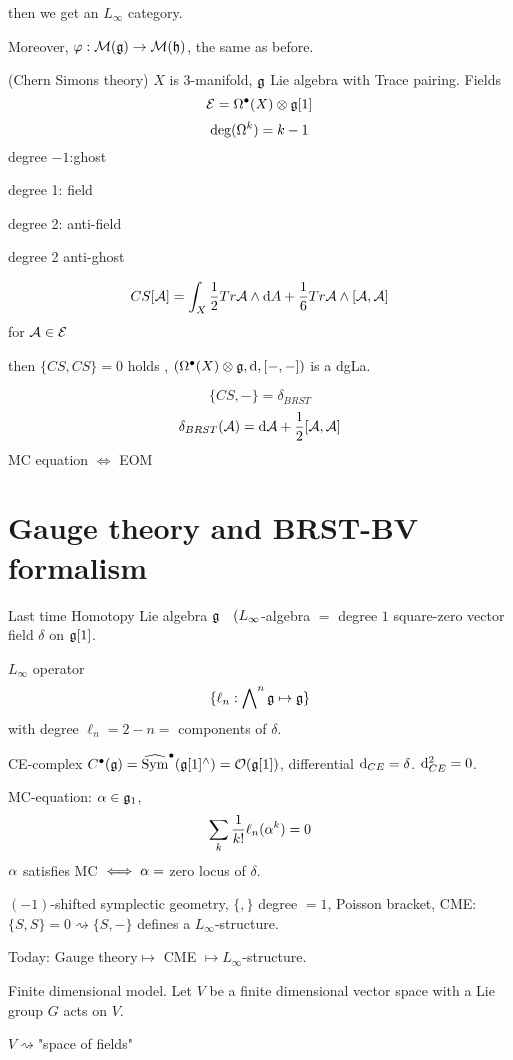 then we get an $L_\infty$ category.

Moreover, $\varphi:\mathcal{M}(\mathfrak{g})\to\mathcal{M}(\mathfrak{h})$,
the same as before.

\begin{example}(Chern Simons theory)
$X$ is 3-manifold, $\mathfrak{g}$ Lie algebra with Trace pairing.
Fields
$$\mathcal{E}=\Omega^{\bullet}(X)\otimes\mathfrak{g}[1]$$
$$\deg(\Omega^k)=k-1$$
degree $-1$:ghost

degree 1: field

degree 2: anti-field

degree 2 anti-ghost

$$CS[\mathcal{A}]=\int_X\frac{1}{2}Tr\mathcal{A}\wedge\mathrm{d} A+\frac{1}{6}Tr\mathcal{A}\wedge[\mathcal{A},\mathcal{A}]$$
for $\mathcal{A}\in\mathcal{E}$

then $\{CS,CS\}=0$ holds ,
$(\Omega^{\bullet}(X)\otimes\mathfrak{g},\mathrm{d},[-,-])$ is a dgLa.

$$\{CS,-\}=\delta_{BRST}$$
$$\delta_{BRST}(\mathcal{A})=\mathrm{d} \mathcal{A}+\frac{1}{2}[\mathcal{A},\mathcal{A}]$$
MC equation $\iff$ EOM
\end{example}



\section{Gauge theory and BRST-BV formalism}

Last time
Homotopy Lie algebra $\mathfrak{g}\quad(L_\infty$-algebra
$=$ degree $1$ square-zero vector field $\delta$ on $\mathfrak{g}[1]$.

$L_\infty$ operator
$$\{\ell_n:\bigwedge\nolimits^{n}\mathfrak{g}\mapsto \mathfrak{g}\}$$
with degree $\ell_n=2-n=$ components of $\delta$.

CE-complex $C^{\bullet} (\mathfrak{g})=\widehat{\operatorname{Sym}}^{\bullet}(\mathfrak{g}[1]^\wedge)=\mathcal{O}(\mathfrak{g}[1])$,
differential $\mathrm{d}_{CE}=\delta$.
$\mathrm{d}_{CE}^2=0$.

MC-equation: $\alpha\in\mathfrak{g}_1$,
$$\sum_{k}\frac{1}{k!}\ell_n(\alpha^k)=0$$
$\alpha$ satisfies MC $\iff\alpha=$ zero locus of $\delta$.

$(-1)$-shifted symplectic geometry, $\{,\}$ degree $=1$, Poisson bracket,
CME: $\{S,S\}=0\rightsquigarrow \{S,-\}$ defines a $L_\infty$-structure.
\vsp

Today: Gauge theory$\mapsto$ CME $\mapsto L_\infty$-structure.

Finite dimensional model.
Let $V$ be a finite dimensional vector space with a Lie group $G$ acts on $V$.

$V\rightsquigarrow$"space of fields"

